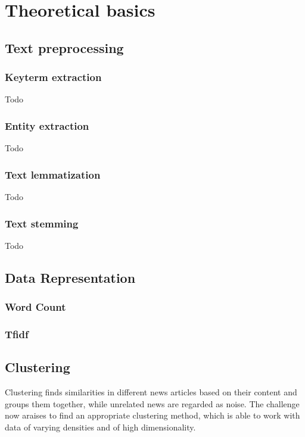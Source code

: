 \section{Theoretical basics}

\subsection{Text preprocessing}

\subsubsection{Keyterm extraction}
Todo

\subsubsection{Entity extraction}
Todo

\subsubsection{Text lemmatization}
Todo

\subsubsection{Text stemming}
Todo

\subsection{Data Representation}

\subsubsection{Word Count}

\subsubsection{Tfidf}

\subsection{Clustering}
Clustering finds similarities in different news articles based on their content and groups them together, while unrelated news are regarded as noise. The challenge now araises to find an appropriate clustering method, which is able to work with data of varying densities and of high dimensionality.

